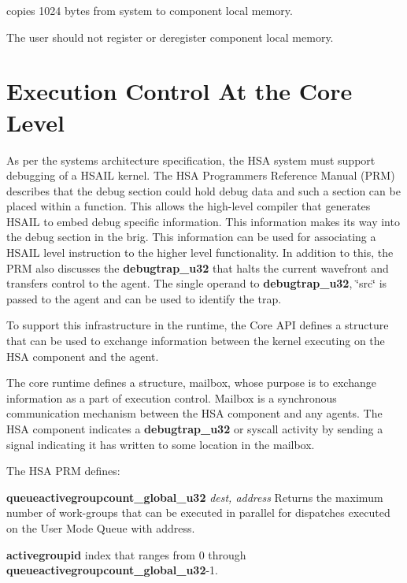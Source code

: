 \documentclass[draft]{book}
\newcommand{\reffun}[1]{\textbf{#1}}
\newcommand{\refhsl}[1]{\reffun{#1}}
\begin{document}
copies 1024 bytes from system to component local memory.

The user should not register or deregister component local memory.


\hypertarget{coredebug}{}\section{Execution Control
  At the Core Level}\label{coredebug}

As per the systems architecture specification, the HSA system must support
debugging of a HSAIL kernel. The HSA Programmers Reference Manual (PRM)
describes that the debug section could hold debug data and such a section can be
placed within a function. This allows the high-level compiler that generates
HSAIL to embed debug specific information. This information makes its way into
the debug section in the brig. This information can be used for associating a
HSAIL level instruction to the higher level functionality. In addition to this,
the PRM also discusses the \refhsl{debugtrap_u32} that halts the current
wavefront and transfers control to the agent. The single operand to
\refhsl{debugtrap_u32}, \char`\"{}src\char`\"{} is passed to the agent and can
be used to identify the trap.

To support this infrastructure in the runtime, the Core API defines a structure
that can be used to exchange information between the kernel executing on the HSA
component and the agent.

The core runtime defines a structure, mailbox, whose purpose is to exchange
information as a part of execution control. Mailbox is a synchronous
communication mechanism between the HSA component and any agents. The HSA
component indicates a \refhsl{debugtrap_u32} or syscall activity by sending a
signal indicating it has written to some location in the mailbox.

The HSA PRM defines:

\begin{description}
\item \refhsl{queueactivegroupcount_global_u32} {\itshape dest, address}
  Returns the maximum number of work-groups that can be executed in parallel for
  dispatches executed on the User Mode Queue with address.

\item \refhsl{activegroupid} index that ranges from 0 through
  \refhsl{queueactivegroupcount_global_u32}-1.
\end{description}
\end{document}
